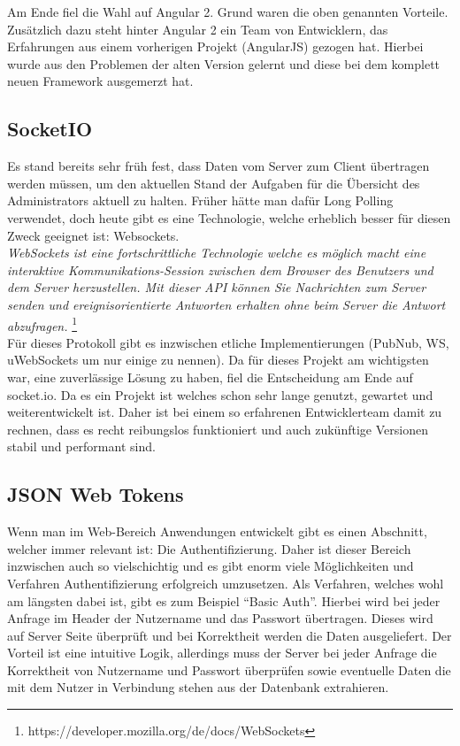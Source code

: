 Am Ende fiel die Wahl auf Angular 2. Grund waren die oben genannten Vorteile. Zusätzlich dazu steht hinter Angular 2 ein Team von Entwicklern, das Erfahrungen aus einem vorherigen Projekt (AngularJS) gezogen hat. Hierbei wurde aus den Problemen der alten Version gelernt und diese bei dem komplett neuen Framework ausgemerzt hat.

\subsection{SocketIO}

Es stand bereits sehr früh fest, dass Daten vom Server zum Client übertragen werden müssen, um den aktuellen Stand der Aufgaben für die Übersicht des Administrators aktuell zu halten. Früher hätte man dafür Long Polling verwendet, doch heute gibt es eine Technologie, welche erheblich besser für diesen Zweck geeignet ist: Websockets. \\


\emph{\glqq   
WebSockets ist eine fortschrittliche Technologie welche es möglich macht eine interaktive Kommunikations-Session zwischen dem Browser des Benutzers und dem Server herzustellen. Mit dieser API können Sie Nachrichten zum Server senden und ereignisorientierte Antworten erhalten ohne beim Server die Antwort abzufragen.
\grqq} \footnote{https://developer.mozilla.org/de/docs/WebSockets} \\


Für dieses Protokoll gibt es inzwischen etliche Implementierungen (PubNub, WS, uWebSockets um nur einige zu nennen). Da für dieses Projekt am wichtigsten war, eine zuverlässige Lösung zu haben, fiel die Entscheidung am Ende auf socket.io. Da es ein Projekt ist welches schon sehr lange genutzt, gewartet und weiterentwickelt ist. Daher ist bei einem so erfahrenen Entwicklerteam damit zu rechnen, dass es recht reibungslos funktioniert und auch zukünftige Versionen stabil und performant sind.

\subsection{JSON Web Tokens} \label{JWT}

Wenn man im Web-Bereich Anwendungen entwickelt gibt es einen Abschnitt, welcher immer relevant ist: Die Authentifizierung. Daher ist dieser Bereich inzwischen auch so vielschichtig und es gibt enorm viele Möglichkeiten und Verfahren Authentifizierung erfolgreich umzusetzen. Als Verfahren, welches wohl am längsten dabei ist, gibt es zum Beispiel ``Basic Auth''. Hierbei wird bei jeder Anfrage im Header der Nutzername und das Passwort übertragen. Dieses wird auf Server Seite überprüft und bei Korrektheit werden die Daten ausgeliefert. Der Vorteil ist eine intuitive Logik, allerdings muss der Server bei jeder Anfrage die Korrektheit von Nutzername und Passwort überprüfen sowie eventuelle Daten die mit dem Nutzer in Verbindung stehen aus der Datenbank extrahieren. \\


